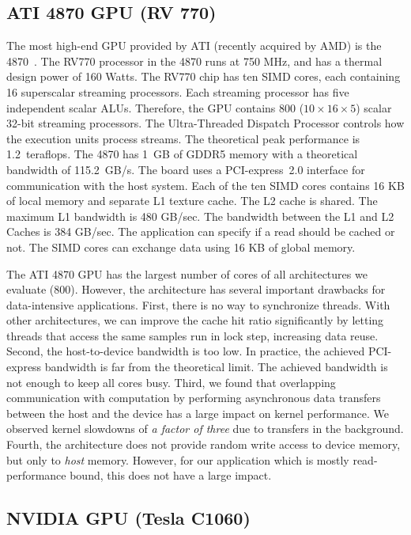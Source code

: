 \documentclass{article}
\begin{document}
\subsection{ATI 4870 GPU (RV 770)}

The most high-end GPU provided by ATI (recently acquired by AMD) is the 4870~\cite{amd-manual}. 
The RV770 processor in the 4870 runs at 750 MHz, and has a thermal design
power of 160 Watts. 
The RV770 chip has ten SIMD cores, each containing 16 
superscalar streaming processors. Each streaming
processor has five independent scalar ALUs. Therefore, the GPU
contains 800 ($10 \times 16 \times 5$) scalar 32-bit streaming processors.  The
Ultra-Threaded Dispatch Processor controls how the execution units
process streams. 
The theoretical peak performance is 1.2~teraflops.
The 4870 has 1~GB of GDDR5 memory with a theoretical bandwidth of 115.2~GB/s.
The board uses a PCI-express~2.0 interface for communication with
the host system.
Each of the ten SIMD cores contains 16 KB of local memory and separate L1
texture cache.
The L2 cache is shared. The
maximum L1 bandwidth is 480 GB/sec. The bandwidth between the L1 and
L2 Caches is 384 GB/sec. The application can specify if a read should be cached or not.
The SIMD cores can exchange data using 16 KB of global
memory.

The ATI 4870 GPU has the largest number of cores of all architectures
we evaluate (800).  However, the architecture has several important
drawbacks for data-intensive applications.  First, there is no way to
synchronize threads. With other architectures, we can improve the
cache hit ratio significantly by letting threads that access the same
samples run in lock step, increasing data reuse.  Second, the
host-to-device bandwidth is too low. In practice, the achieved
PCI-express bandwidth is far from the theoretical limit. The achieved
bandwidth is not enough to keep all cores busy.  Third, we found that
overlapping communication with computation by performing asynchronous
data transfers between the host and the device has a large impact on
kernel performance. We observed kernel slowdowns of \emph{a factor of
  three} due to transfers in the background.  Fourth, the architecture
does not provide random write access to device memory, but only to
\emph{host} memory. However, for our application which is mostly
read-performance bound, this does not have a large impact.


\subsection{NVIDIA GPU (Tesla C1060)}
\end{document}
